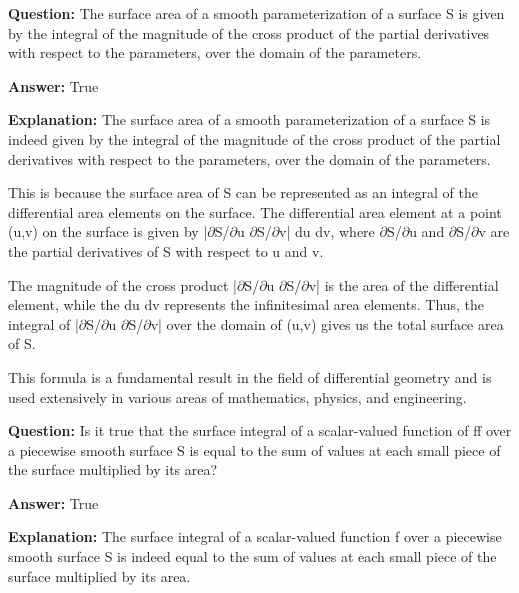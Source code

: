\documentclass{article}
\begin{document}
                \vspace{0.5cm} 
        
            
                \textbf {Question:} The surface area of a smooth parameterization of a surface S is given by the integral of the magnitude of the cross product of the partial derivatives with respect to the parameters, over the domain of the parameters.
                
                \textbf{Answer:} True

                \textbf{Explanation:} The surface area of a smooth parameterization of a surface S is indeed given by the integral of the magnitude of the cross product of the partial derivatives with respect to the parameters, over the domain of the parameters.

This is because the surface area of S can be represented as an integral of the differential area elements on the surface. The differential area element at a point (u,v) on the surface is given by |\ensuremath{\partial}S/\ensuremath{\partial}u {\texttimes} \ensuremath{\partial}S/\ensuremath{\partial}v| du dv, where \ensuremath{\partial}S/\ensuremath{\partial}u and \ensuremath{\partial}S/\ensuremath{\partial}v are the partial derivatives of S with respect to u and v.

The magnitude of the cross product |\ensuremath{\partial}S/\ensuremath{\partial}u {\texttimes} \ensuremath{\partial}S/\ensuremath{\partial}v| is the area of the differential element, while the du dv represents the infinitesimal area elements. Thus, the integral of |\ensuremath{\partial}S/\ensuremath{\partial}u {\texttimes} \ensuremath{\partial}S/\ensuremath{\partial}v| over the domain of (u,v) gives us the total surface area of S.

This formula is a fundamental result in the field of differential geometry and is used extensively in various areas of mathematics, physics, and engineering.
                
                \vspace{0.5cm} 
        
            
                \textbf {Question:} Is it true that the surface integral of a scalar-valued function of ff over a piecewise smooth surface S is equal to the sum of values at each small piece of the surface multiplied by its area?
                
                \textbf{Answer:} True

                \textbf{Explanation:} The surface integral of a scalar-valued function f over a piecewise smooth surface S is indeed equal to the sum of values at each small piece of the surface multiplied by its area.
\end{document}
